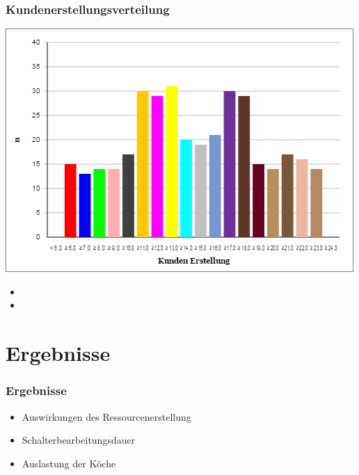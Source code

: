 \documentclass{beamer}
\begin{document}
\begin{frame} %
  \frametitle{Kundenerstellungsverteilung } %
  \includegraphics[width=\textwidth, height=0.85\textheight]{./Kunden.png}
 \begin{itemize}
 \item[]
 \item[]
 \end{itemize}
\end{frame}

\section{Ergebnisse}
\begin{frame} %
  \frametitle{Ergebnisse} %
  \begin{itemize}
  	\item Auswirkungen des Ressourcenerstellung
  	\item Schalterbearbeitungsdauer
  	\item Auslastung der Köche
  \end{itemize}
\end{frame}
\end{document}
